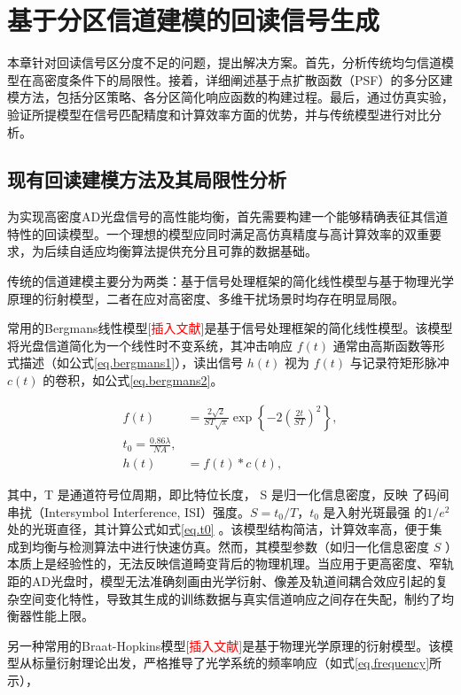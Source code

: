 \chapter{基于分区信道建模的回读信号生成 \label{sec:chapter.cnn1}}
	本章针对回读信号区分度不足的问题，提出解决方案。首先，分析传统均匀信道模型在高密度条件下的局限性。接着，详细阐述基于点扩散函数（PSF）的多分区建模方法，包括分区策略、各分区简化响应函数的构建过程。最后，通过仿真实验，验证所提模型在信号匹配精度和计算效率方面的优势，并与传统模型进行对比分析。

\section{现有回读建模方法及其局限性分析}

为实现高密度AD光盘信号的高性能均衡，首先需要构建一个能够精确表征其信道特性的回读模型。一个理想的模型应同时满足高仿真精度与高计算效率的双重要求，为后续自适应均衡算法提供充分且可靠的数据基础。

传统的信道建模主要分为两类：基于信号处理框架的简化线性模型与基于物理光学原理的衍射模型，二者在应对高密度、多维干扰场景时均存在明显局限。

常用的Bergmans线性模型[\textcolor{red}{插入文献}]是基于信号处理框架的简化线性模型。该模型将光盘信道简化为一个线性时不变系统，其冲击响应  $f(t)$  通常由高斯函数等形式描述（如公式\ref{eq.bergmans1}），读出信号 $h(t)$  视为 \( f(t) \) 与记录符矩形脉冲 \( c(t) \) 的卷积，如公式\ref{eq.bergmans2}。

\begin{align}
	f\left( t \right) &= \frac{2\sqrt{2}}{ST\sqrt{\pi}} \exp\left\{ -2 \left( \frac{2t}{ST} \right)^{2} \right\},  \label{eq.bergmans1} \\
	t_0 =  \frac{0.86\lambda}{NA} , \label{eq.t0} \\
	h(t) &= f(t) * c(t), \label{eq.bergmans2}
\end{align}

其中，T 是通道符号位周期，即比特位长度， S 是归一化信息密度，反映
了码间串扰（Intersymbol Interference, ISI）强度。$S = 𝑡_0/T$，$𝑡_0$ 是入射光斑最强
的$1/e^2$处的光斑直径，其计算公式如式\ref{eq.t0} 。该模型结构简洁，计算效率高，便于集成到均衡与检测算法中进行快速仿真。然而，其模型参数（如归一化信息密度 \( S \) ）本质上是经验性的，无法反映信道畸变背后的物理机理。当应用于更高密度、窄轨距的AD光盘时，模型无法准确刻画由光学衍射、像差及轨道间耦合效应引起的复杂空间变化特性，导致其生成的训练数据与真实信道响应之间存在失配，制约了均衡器性能上限。

另一种常用的Braat-Hopkins模型[\textcolor{red}{插入文献}]是基于物理光学原理的衍射模型。该模型从标量衍射理论出发，严格推导了光学系统的频率响应（如式\ref{eq.frequency}所示），

